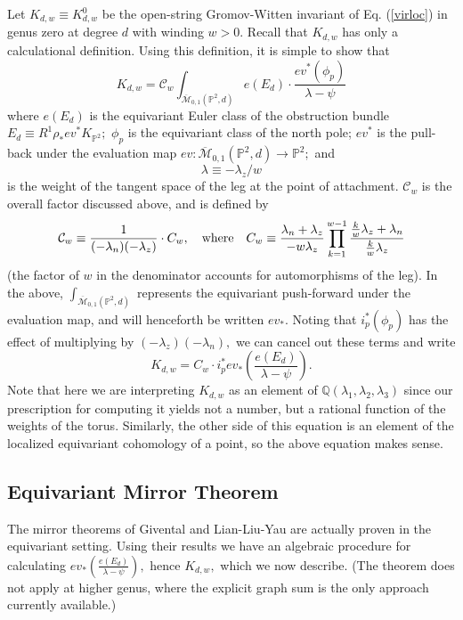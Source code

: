 \documentclass[a4paper,11pt]{article}
\newcommand{\PP}{{\mathbb{P}}}
\newcommand{\Q}{\mathbb{Q}}
\newcommand{\la}{\lambda}
\begin{document}
Let $K_{d,w} \equiv K^0_{d,w}$ be the open-string
Gromov-Witten invariant of Eq. \!\! (\ref{virloc})
in genus zero at degree $d$ with winding $w > 0.$
Recall that $K_{d,w}$ has only a calculational
definition.  Using this definition, it is simple to
show that
\begin{equation}
\label{gwdef}
K_{d,w} = {\mathcal C}_w \int_{\overline{\mathcal M}_{0,1}
({\mathbb P}^2,d)} e(E_d) \cdot
\frac{ev^*(\phi_p)}{\lambda-\psi}
\end{equation}
where $e(E_d)$ is the equivariant Euler class of
the obstruction bundle $E_d \equiv
R^1\rho_*ev^*K_{{\mathbb P}^2};$
$\phi_p$ is the equivariant class of the
north pole;
$ev^*$ is the pull-back under the evaluation
map $ev:  {\overline{\mathcal M}_{0,1}
({\mathbb P}^2,d)} \rightarrow \PP^2;$
and $$\lambda \equiv -\lambda_z/w$$
is the weight of the tangent space of the
leg at the point of attachment.  $\mathcal{C}_w$
is the overall factor discussed above, and is
defined by
\begin{equation}
\label{Cw}
{\mathcal C}_{w} \equiv \frac{1}{(-\la_n)(-\la_z)}
\cdot
C_w,\quad {\rm where}
\quad C_w \equiv \frac{\la_n + \la_z}{-w\la_z}
\prod_{k=1}^{w-1}\frac{\frac{k}{w}\la_z + \la_n}{\frac{k}{w}\la_z}
\end{equation}
(the factor of $w$ in the denominator accounts
for automorphisms of the leg).
In the above,
$ \int_{\overline{\mathcal M}_{0,1}
({\mathbb P}^2,d)}$
represents the equivariant push-forward under
the evaluation map, and
will henceforth be written $ev_{*}.$
Noting that $i_p^*(\phi_p)$ has the effect of
multiplying by $(-\lambda_z)(-\lambda_n),$
we can cancel out these terms and write
\begin{equation}
\label{onepoint}K_{d,w} =
C_w \cdot i_p^*ev_{*}\left(
\frac{e(E_d)}{\lambda-\psi}\right).
\end{equation}
Note that here we are interpreting $K_{d,w}$ as an
element of $\Q (\lambda_1,\lambda_2,\lambda_3)$ since
our prescription for computing it yields not a number,
but a rational function of the weights of the torus.
Similarly, the other side of this equation is
an element of the localized equivariant cohomology
of a point, so the above equation makes sense.

\subsection{Equivariant Mirror Theorem}

The mirror theorems of Givental \cite{G1} \cite{G2}
and Lian-Liu-Yau \cite{LLY} are actually proven in 
the equivariant setting.
Using their results we have an algebraic procedure
for calculating $ev_{*}\left(
\frac{e(E_d)}{\lambda-\psi}\right),$
hence $K_{d,w},$
which we now describe.  (The theorem does not apply at
higher genus, where the explicit graph sum is the only
approach currently available.)
\end{document}
